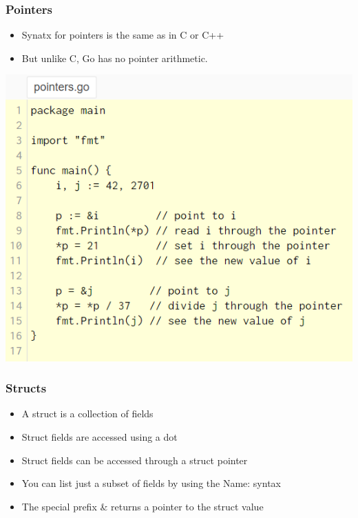 \documentclass[14pt]{beamer}
\begin{document}
{
\begin{frame}
    \frametitle{Pointers}
    \begin{itemize}
        \item Synatx for pointers is the same as in C or C++
        \item But unlike C, Go has no pointer arithmetic.
    \end{itemize}
    \begin{center}
        \includegraphics[width=0.6\linewidth]{img/pointers.PNG}
    \end{center}
\end{frame}
}

{
\begin{frame}
    \frametitle{Structs}
    \begin{itemize}
        \item A struct is a collection of fields
        \item Struct fields are accessed using a dot
        \item Struct fields can be accessed through a struct pointer
        \item You can list just a subset of fields by using the Name: syntax
        \item The special prefix \& returns a pointer to the struct value
    \end{itemize}
\end{frame}
}
\end{document}
